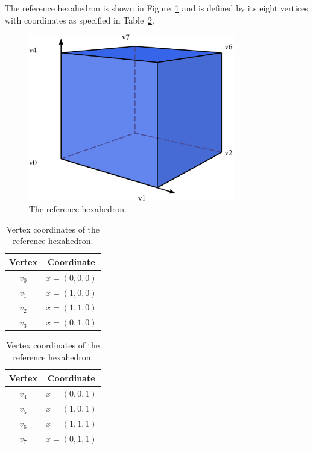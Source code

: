 The reference hexahedron is shown in Figure~\ref{fig:hexahedron} and
is defined by its eight vertices with coordinates as specified in
Table~\ref{tab:hexahedron,vertices}.

\begin{figure}
\linespread{1.2}\selectfont
  \begin{center}
    \includegraphics[width=9cm]{chapters/alnes-2/pdf/hexahedron.pdf}
    \caption{The reference hexahedron.}
    \label{fig:hexahedron}
  \end{center}
\end{figure}

\begin{table}
\linespread{1.2}\selectfont
  \begin{center}
    \begin{tabular}{|c|c|}
      \hline
      Vertex & Coordinate \\
      \hline
      \hline
      $v_0$ & $x = (0, 0, 0)$ \\
      \hline
      $v_1$ & $x = (1, 0, 0)$ \\
      \hline
      $v_2$ & $x = (1, 1, 0)$ \\
      \hline
      $v_3$ & $x = (0, 1, 0)$ \\
      \hline
    \end{tabular}
    \begin{tabular}{|c|c|}
      \hline
      Vertex & Coordinate \\
      \hline
      \hline
      $v_4$ & $x = (0, 0, 1)$ \\
      \hline
      $v_5$ & $x = (1, 0, 1)$ \\
      \hline
      $v_6$ & $x = (1, 1, 1)$ \\
      \hline
      $v_7$ & $x = (0, 1, 1)$ \\
      \hline
    \end{tabular}
    \caption{Vertex coordinates of the reference hexahedron.}
    \label{tab:hexahedron,vertices}
  \end{center}
\end{table}
